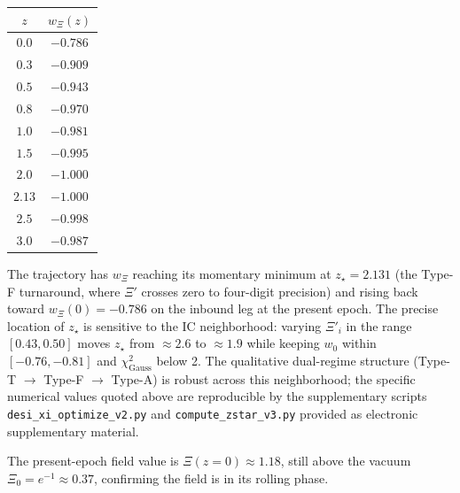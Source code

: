 \documentclass[11pt,reqno]{amsart}
\theoremstyle{plain}
\theoremstyle{definition}
\theoremstyle{remark}
\begin{document}
\begin{center}
\begin{tabular}{c|c}
$z$ & $w_\Xi(z)$\\
\hline
$0.0$ & $-0.786$\\
$0.3$ & $-0.909$\\
$0.5$ & $-0.943$\\
$0.8$ & $-0.970$\\
$1.0$ & $-0.981$\\
$1.5$ & $-0.995$\\
$2.0$ & $-1.000$\\
$2.13$ & $-1.000$\\
$2.5$ & $-0.998$\\
$3.0$ & $-0.987$
\end{tabular}
\end{center}

The trajectory has $w_\Xi$ reaching its momentary minimum at $z_\star = 2.131$
(the Type-F turnaround, where $\Xi'$ crosses zero to four-digit precision)
and rising back toward $w_\Xi(0) = -0.786$ on the inbound leg at the
present epoch. The precise location of $z_\star$ is sensitive
to the IC neighborhood: varying $\Xi'_i$ in the range $[0.43, 0.50]$ moves
$z_\star$ from $\approx 2.6$ to $\approx 1.9$ while keeping $w_0$ within
$[-0.76, -0.81]$ and $\chi^2_{\text{Gauss}}$ below 2. The qualitative
dual-regime structure (Type-T $\to$ Type-F $\to$ Type-A) is robust across
this neighborhood; the specific numerical values quoted above are
reproducible by the supplementary scripts \texttt{desi\_xi\_optimize\_v2.py}
and \texttt{compute\_zstar\_v3.py} provided as electronic supplementary
material.

The present-epoch field value is $\Xi(z=0) \approx 1.18$, still above
the vacuum $\Xi_0 = e^{-1} \approx 0.37$, confirming the field is in
its rolling phase.
\end{document}
